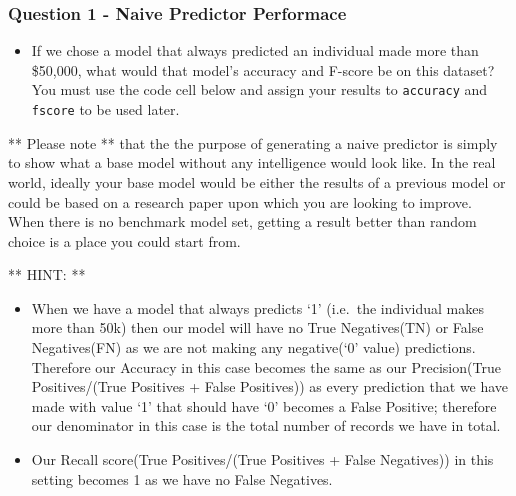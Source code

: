 \documentclass[11pt]{article}
\providecommand{\tightlist}{%
      \setlength{\itemsep}{0pt}\setlength{\parskip}{0pt}}
\begin{document}
    \hypertarget{question-1---naive-predictor-performace}{%
\subsubsection{Question 1 - Naive Predictor
Performace}\label{question-1---naive-predictor-performace}}

\begin{itemize}
\tightlist
\item
  If we chose a model that always predicted an individual made more than
  \$50,000, what would that model's accuracy and F-score be on this
  dataset? You must use the code cell below and assign your results to
  \texttt{\textquotesingle{}accuracy\textquotesingle{}} and
  \texttt{\textquotesingle{}fscore\textquotesingle{}} to be used later.
\end{itemize}

** Please note ** that the the purpose of generating a naive predictor
is simply to show what a base model without any intelligence would look
like. In the real world, ideally your base model would be either the
results of a previous model or could be based on a research paper upon
which you are looking to improve. When there is no benchmark model set,
getting a result better than random choice is a place you could start
from.

** HINT: **

\begin{itemize}
\tightlist
\item
  When we have a model that always predicts `1' (i.e.~the individual
  makes more than 50k) then our model will have no True Negatives(TN) or
  False Negatives(FN) as we are not making any negative(`0' value)
  predictions. Therefore our Accuracy in this case becomes the same as
  our Precision(True Positives/(True Positives + False Positives)) as
  every prediction that we have made with value `1' that should have `0'
  becomes a False Positive; therefore our denominator in this case is
  the total number of records we have in total.
\item
  Our Recall score(True Positives/(True Positives + False Negatives)) in
  this setting becomes 1 as we have no False Negatives.
\end{itemize}
\end{document}
